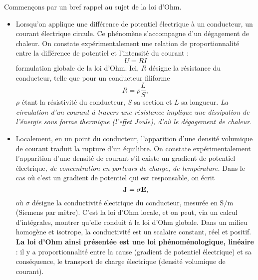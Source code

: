 \documentclass[11pt,a4paper]{report}
\begin{document}
Commençons par un bref rappel au sujet de la loi d'Ohm.
\begin{itemize}
	\item Lorsqu'on applique une différence de potentiel électrique à un conducteur, un courant électrique circule. Ce phénomène s'accompagne d'un dégagement de chaleur. On constate expérimentalement une relation de proportionnalité entre la différence de potentiel et l'intensité du courant :
	\begin{equation}
		U = RI
	\end{equation}	
	formulation globale de la loi d'Ohm. Ici, $R$ désigne la résistance du conducteur, telle que pour un conducteur filiforme
	\begin{equation}
		R = \rho \frac{L}{S},
	\end{equation} 
	$\rho$ étant la résistivité du conducteur, $S$ sa section et $L$ sa longueur. \textit{La circulation d'un courant à travers une résistance implique une dissipation de l'énergie 
	sous forme thermique (l'effet Joule), d'où le dégagement de chaleur.}\\
	
	\item Localement, en un point du conducteur, l'apparition d'une densité volumique de courant traduit la rupture d'un équilibre. On constate expérimentalement l'apparition d'une densité de courant s'il existe un gradient de potentiel électrique\textit{, de concentration en porteurs de charge, de température.} Dans le cas où c'est un gradient de potentiel qui est responsable, on écrit
	\begin{equation}
		\bold{J} = \sigma \bold{E},
	\end{equation}
	où $\sigma$ désigne la conductivité électrique du conducteur, mesurée en $\text{S}/\text{m}$ (Siemens par mètre). C'est la loi d'Ohm locale, et on peut, via un calcul d'intégrales, montrer qu'elle conduit à la loi d'Ohm globale. Dans un milieu homogène et isotrope, la conductivité est un scalaire constant, réel et positif. \textbf{La loi d'Ohm ainsi présentée est une loi phénoménologique, linéaire} : il y a proportionnalité entre la cause (gradient de potentiel électrique) et sa conséquence, le transport de charge électrique (densité volumique de courant).\\
	

\end{itemize}
\end{document}
